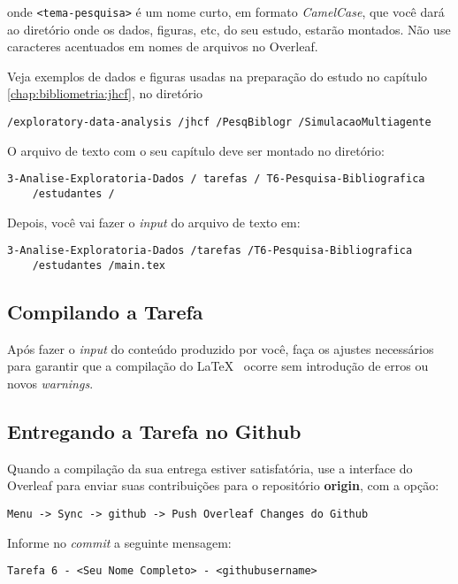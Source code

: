 onde
\texttt{<tema-pesquisa>} é um nome curto, em formato \textit{CamelCase}, que você dará ao diretório onde os dados, figuras, etc, do seu estudo, estarão montados. Não use caracteres acentuados em nomes de arquivos no Overleaf.

Veja exemplos de dados e figuras usadas na preparação do estudo no capítulo \ref{chap:bibliometria:jhcf}, no diretório
\begin{verbatim}
/exploratory-data-analysis /jhcf /PesqBiblogr /SimulacaoMultiagente
\end{verbatim}

O arquivo de texto com o seu capítulo deve ser montado no diretório:
\begin{verbatim}
3-Analise-Exploratoria-Dados / tarefas / T6-Pesquisa-Bibliografica 
    /estudantes /
\end{verbatim}

Depois, você vai fazer o \textit{input} do arquivo de texto em:
\begin{verbatim}
3-Analise-Exploratoria-Dados /tarefas /T6-Pesquisa-Bibliografica 
    /estudantes /main.tex
\end{verbatim}

\subsection{Compilando a Tarefa}

Após fazer o \textit{input} do conteúdo produzido por você, faça os ajustes necessários para garantir que a compilação do \LaTeX~ ocorre sem introdução de erros ou novos \textit{warnings}.

\subsection{Entregando a Tarefa no Github}

Quando a compilação da sua entrega estiver satisfatória, use a interface do Overleaf para enviar suas contribuições para o repositório \textbf{origin}, com a opção:

\begin{verbatim}
Menu -> Sync -> github -> Push Overleaf Changes do Github
\end{verbatim}

Informe no \textit{commit} a seguinte mensagem: 
\begin{verbatim}
Tarefa 6 - <Seu Nome Completo> - <githubusername>
\end{verbatim}

